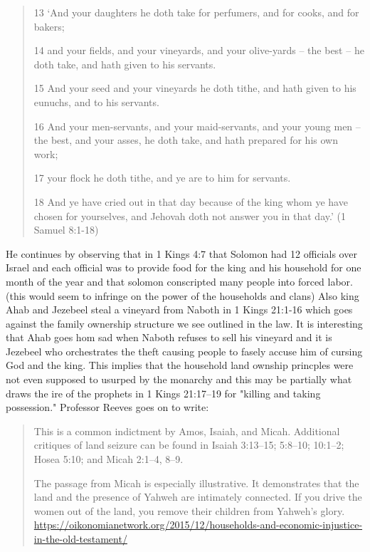 \documentclass[11pt]{article}
\begin{document}
\begin{quote}
13 `And your daughters he doth take for perfumers, and for cooks, and for bakers;

14 and your fields, and your vineyards, and your olive-yards -- the best -- he doth take, and hath given to his servants.

15 And your seed and your vineyards he doth tithe, and hath given to his eunuchs, and to his servants.

16 And your men-servants, and your maid-servants, and your young men -- the best, and your asses, he doth take, and hath prepared for his own work;

17 your flock he doth tithe, and ye are to him for servants.

18 And ye have cried out in that day because of the king whom ye have chosen for yourselves, and Jehovah doth not answer you in that day.' (1 Samuel 8:1-18)
\end{quote} 

He continues by observing that in 1 Kings 4:7 that Solomon had 12 officials over Israel and each official was to provide food for the king and his household for one month of the year and that solomon conscripted many people into forced labor. (this would seem to infringe on the power of the households and clans) Also king Ahab and Jezebeel steal a vineyard from Naboth in 1 Kings 21:1-16 which goes against the family ownership structure we see outlined in the law. It is interesting that Ahab goes hom sad when Naboth refuses to sell his vineyard and it is Jezebeel who orchestrates the theft causing people to fasely accuse him of cursing God and the king. This implies that the household land ownship princples were not even supposed to usurped by the monarchy and this may be partially what draws the ire of the prophets in 1 Kings 21:17–19 for "killing and taking possession." Professor Reeves goes on to write:
\begin{quote}
This is a common indictment by Amos, Isaiah, and Micah. Additional critiques of land seizure can be found in Isaiah 3:13–15; 5:8–10; 10:1–2; Hosea 5:10; and Micah 2:1–4, 8–9.

The passage from Micah is especially illustrative. It demonstrates that the land and the presence of Yahweh are intimately connected. If you drive the women out of the land, you remove their children from Yahweh’s glory. \url{https://oikonomianetwork.org/2015/12/households-and-economic-injustice-in-the-old-testament/}
\end{quote} 
\end{document}
